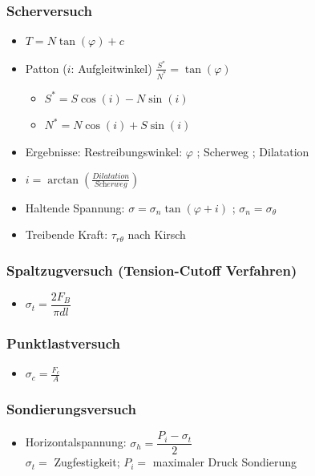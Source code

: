 \documentclass[fleqn,twoside]{article}
\begin{document}
\subsubsection{Scherversuch}

\begin{itemize}
    \item $T=N\tan(\varphi) +c$
    \item Patton ($i$: Aufgleitwinkel) $\frac{S^*}{N^*}=\tan(\varphi)$
    \begin{itemize}
        \item $S^*=S\cos(i)-N\sin(i)$
        \item $N^*=N\cos(i)+S\sin(i)$
    \end{itemize}
    \item Ergebnisse: Restreibungswinkel: $\varphi$ ; Scherweg ; Dilatation
    \item $i=\arctan\left( \frac{\textit{Dilatation}}{\textit{Scherweg}}\right)$
    \item Haltende Spannung: $\sigma = \sigma_{n} \tan(\varphi + i)$ ; $\sigma_n = \sigma_\theta$
    \item Treibende Kraft: $\tau_{r \theta}$ nach Kirsch

\end{itemize}


\subsubsection{Spaltzugversuch (Tension-Cutoff Verfahren)}\label{Spaltzugversuch}

\begin{itemize}
    \item $\sigma_t=\dfrac{2F_B}{\pi dl}$
\end{itemize}

\subsubsection{Punktlastversuch}\label{Punktlastversuch}

\begin{itemize}
    \item $\sigma_c=\frac{F_c}{A}$
\end{itemize}

\subsubsection{Sondierungsversuch}
\begin{itemize}
    \item Horizontalspannung: $\sigma_h = \dfrac{P_i - \sigma_t}{2}$\\
    $\sigma_t =$ Zugfestigkeit; $P_i =$ maximaler Druck Sondierung
\end{itemize}
\end{document}
